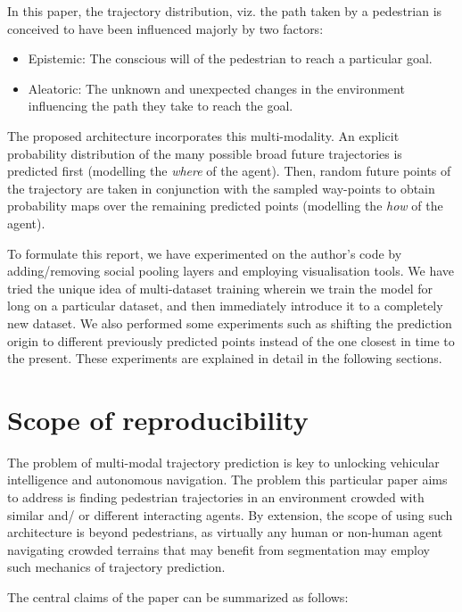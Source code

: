 In this paper, the trajectory distribution, viz. the path taken by a pedestrian is conceived to have been influenced majorly by two factors: 
\begin{itemize}
  \item Epistemic: The conscious will of the pedestrian to reach a particular goal.
  \item Aleatoric: The unknown and unexpected changes in the environment influencing the path they take to reach the goal.
\end{itemize}
 
 The proposed architecture incorporates this multi-modality. An explicit probability distribution of the many possible broad future trajectories is predicted first (modelling the \emph{where} of the agent). Then, random future points of the trajectory are taken in conjunction with the sampled way-points to obtain probability maps over the remaining predicted points (modelling the \emph{how} of the agent).
 

To formulate this report, we have experimented on the author's code by adding/removing social pooling layers and employing visualisation tools. We have tried the unique idea of multi-dataset training wherein we train the model for long on a particular dataset, and then immediately introduce it to a completely new dataset. We also performed some experiments such as shifting the prediction origin to different previously predicted points instead of the one closest in time to the present. These experiments are explained in detail in the following sections. 

\section{Scope of reproducibility}
\label{sec:claims}


The problem of multi-modal trajectory prediction is key to unlocking vehicular intelligence and autonomous navigation. The problem this particular paper aims to address is finding pedestrian trajectories in an environment crowded with similar and/ or different interacting agents. By extension, the scope of using such architecture is beyond pedestrians, as virtually any human or non-human agent navigating crowded terrains that may benefit from segmentation may employ such mechanics of trajectory prediction.

The central claims of the paper can be summarized as follows:


